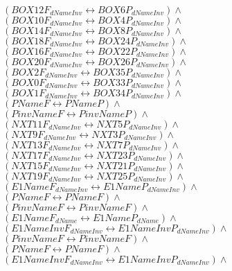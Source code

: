 \documentclass[a4paper,10pt]{article}
\begin{document}
 $ (BOX12F_{dNameInv} \leftrightarrow BOX6P_{dNameInv}) \land $ \\ 
 $ (BOX10F_{dNameInv} \leftrightarrow BOX4P_{dNameInv}) \land $ \\ 
 $ (BOX14F_{dNameInv} \leftrightarrow BOX8P_{dNameInv}) \land $ \\ 
 $ (BOX18F_{dNameInv} \leftrightarrow BOX24P_{dNameInv}) \land $ \\ 
 $ (BOX16F_{dNameInv} \leftrightarrow BOX22P_{dNameInv}) \land $ \\ 
 $ (BOX20F_{dNameInv} \leftrightarrow BOX26P_{dNameInv}) \land $ \\ 
 $ (BOX2F_{dNameInv} \leftrightarrow BOX35P_{dNameInv}) \land $ \\ 
 $ (BOX0F_{dNameInv} \leftrightarrow BOX33P_{dNameInv}) \land $ \\ 
 $ (BOX1F_{dNameInv} \leftrightarrow BOX34P_{dNameInv}) \land $ \\ 
 $ (PNameF \leftrightarrow PNameP) \land $ \\ 
 $ (PinvNameF \leftrightarrow PinvNameP) \land $ \\ 
 $ (NXT11F_{dNameInv} \leftrightarrow NXT5P_{dNameInv}) \land $ \\ 
 $ (NXT9F_{dNameInv} \leftrightarrow NXT3P_{dNameInv}) \land $ \\ 
 $ (NXT13F_{dNameInv} \leftrightarrow NXT7P_{dNameInv}) \land $ \\ 
 $ (NXT17F_{dNameInv} \leftrightarrow NXT23P_{dNameInv}) \land $ \\ 
 $ (NXT15F_{dNameInv} \leftrightarrow NXT21P_{dNameInv}) \land $ \\ 
 $ (NXT19F_{dNameInv} \leftrightarrow NXT25P_{dNameInv}) \land $ \\ 
 $ (E1NameF_{dNameInv} \leftrightarrow E1NameP_{dNameInv}) \land $ \\ 
 $ (PNameF \leftrightarrow PNameF) \land $ \\ 
 $ (PinvNameF \leftrightarrow PinvNameF) \land $ \\ 
 $ (E1NameF_{dName} \leftrightarrow E1NameP_{dName}) \land $ \\ 
 $ (E1NameInvF_{dNameInv} \leftrightarrow E1NameInvP_{dNameInv}) \land $ \\ 
 $ (PinvNameF \leftrightarrow PinvNameF) \land $ \\ 
 $ (PNameF \leftrightarrow PNameF) \land $ \\ 
 $ (E1NameInvF_{dNameInv} \leftrightarrow E1NameInvP_{dNameInv}) \land $ \\ 
\end{document}
